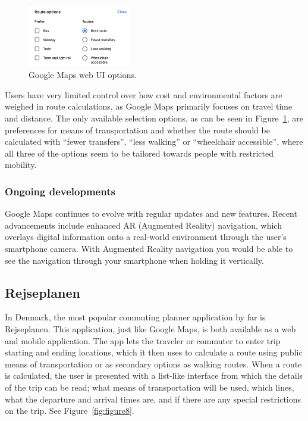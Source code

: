 \begin{figure}
    \begin{center}
        \includegraphics[width=0.4\textwidth]{images/google-maps-options}
    \end{center}
    \caption{Google Maps web UI options.}
    \label{fig:figure7}
\end{figure}

Users have very limited control over how cost and environmental factors are weighed in route calculations, as Google
Maps primarily focuses on travel time and distance.
The only available selection options, as can be seen in Figure~\ref{fig:figure7}, are preferences for means of
transportation and whether the route should be calculated with ``fewer transfers'', ``less walking'' or ``wheelchair
accessible'', where all three of the options seem to be tailored towards people with restricted mobility.

\subsubsection{Ongoing developments}

Google Maps continues to evolve with regular updates and new features.
Recent advancements include enhanced AR (Augmented Reality) navigation, which overlays digital information onto
a real-world environment through the user's smartphone camera.
With Augmented Reality navigation you would be able to see the navigation through your smartphone when holding it
vertically. \cite{googlemapsAR2023}

\subsection{Rejseplanen}\label{subsec:rejseplanen}

In Denmark, the most popular commuting planner application by far is Rejseplanen.
This application, just like Google Maps, is both available as a web and mobile application.
The app lets the traveler or commuter to enter trip starting and ending locations, which it then uses to calculate a
route using public means of transportation or as secondary options as walking routes.
When a route is calculated, the user is presented with a list-like interface from which the details of the trip can be
read; what means of transportation will be used, which lines, what the departure and arrival times are, and if there are
any special restrictions on the trip.
See Figure~\ref{fig:figure8}.


